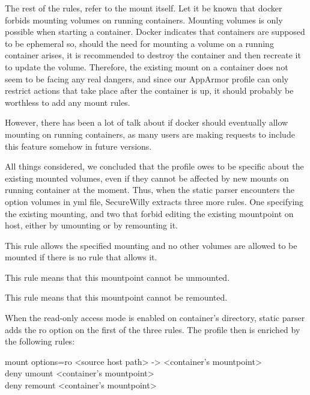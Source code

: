 The rest of the rules, refer to the mount itself. Let it be known that docker forbids mounting volumes on running containers. Mounting volumes is only possible when starting a container. Docker indicates that containers are supposed to be ephemeral so, should the need for mounting a volume on a running container arises,  it is recommended to destroy the container and then recreate it to update the volume. Therefore, the existing mount on a container does not seem to be facing any real dangers, and since our AppArmor profile can only restrict actions that take place after the container is up, it should probably be worthless to add any mount rules.

However,  there has been a lot of talk about if docker should eventually allow mounting on running containers, as many users are making requests to include this feature somehow in future versions.

All things considered, we concluded that the profile owes to be specific about the existing mounted volumes, even if they cannot be affected by new mounts on running container at the moment. Thus, when the static parser encounters the option volumes in yml file, SecureWilly extracts three more rules. One specifying the existing mounting, and two that forbid editing the existing mountpoint on host, either by umounting or by remounting it.
\begin{description}[style=nextline]
\item[mount \textless source host path\textgreater{} -\textgreater{} \textless container's mountpoint\textgreater{}]
This rule allows the specified mounting and no other volumes are allowed to be mounted if there is no rule that allows it.

\item[deny umount \textless container's mountpoint\textgreater{}]
This rule means that this mountpoint cannot be unmounted.

\item[deny remount \textless container's mountpoint\textgreater{}]
This rule means that this mountpoint cannot be remounted.
\end{description}

When the read-only access mode is enabled on container's directory, static parser adds the ro option on the first of the three rules. The profile then is enriched by the following rules:
\begin{description}
\item[mount options=ro \textless source host path\textgreater{} -\textgreater{} \textless container's mountpoint\textgreater{}]
\item[deny umount \textless container's mountpoint\textgreater{}]
\item[deny remount \textless container's mountpoint\textgreater{}]
\end{description}

